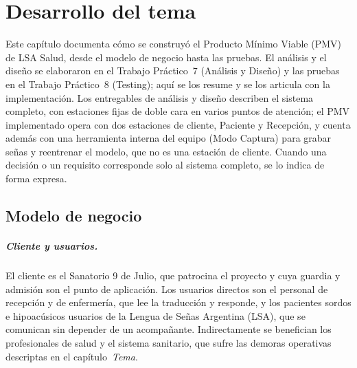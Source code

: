 \chapter{Desarrollo del tema}\label{cap:desarrollo}

Este capítulo documenta cómo se construyó el Producto Mínimo Viable (PMV) de LSA Salud, desde el modelo de negocio hasta las pruebas. El análisis y el diseño se elaboraron en el Trabajo Práctico~7 (Análisis y Diseño) y las pruebas en el Trabajo Práctico~8 (Testing); aquí se los resume y se los articula con la implementación. Los entregables de análisis y diseño describen el sistema completo, con estaciones fijas de doble cara en varios puntos de atención; el PMV implementado opera con dos estaciones de cliente, Paciente y Recepción, y cuenta además con una herramienta interna del equipo (Modo Captura) para grabar señas y reentrenar el modelo, que no es una estación de cliente. Cuando una decisión o un requisito corresponde solo al sistema completo, se lo indica de forma expresa.

\section{Modelo de negocio}\label{sec:modelo-negocio}

\paragraph{Cliente y usuarios.} El cliente es el Sanatorio 9 de Julio, que patrocina el proyecto y cuya guardia y admisión son el punto de aplicación. Los usuarios directos son el personal de recepción y de enfermería, que lee la traducción y responde, y los pacientes sordos e hipoacúsicos usuarios de la Lengua de Señas Argentina (LSA), que se comunican sin depender de un acompañante. Indirectamente se benefician los profesionales de salud y el sistema sanitario, que sufre las demoras operativas descriptas en el capítulo~\emph{Tema}.

